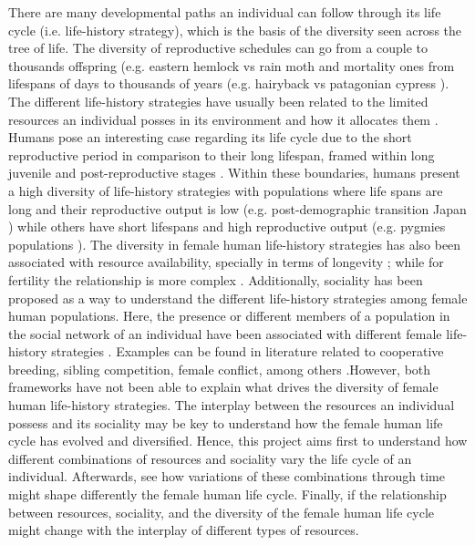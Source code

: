 \documentclass{article}
\begin{document}
There are many developmental paths an individual can follow through its life cycle (i.e. life-history strategy), which is the basis of the diversity seen across the tree of life. The diversity of reproductive schedules can go from a couple to thousands offspring (e.g. eastern hemlock vs rain moth \citep{tindale1932revision,van2017lifetime} and mortality ones from lifespans of days to thousands of years (e.g. hairyback vs patagonian cypress \citep{balsamo1988life,lara19933620}). The different life-history strategies have usually been related to the limited resources an individual posses in its environment and how it allocates them \citep{stearns2000life}. Humans pose an interesting case regarding its life cycle due to the short reproductive period in comparison to their long lifespan, framed within long juvenile and post-reproductive stages \citep{kaplan2000theory}. Within these boundaries, humans present a high diversity of life-history strategies with populations where life spans are long and their reproductive output is low (e.g. post-demographic transition Japan \citep{de2017maximum}) while others have short lifespans and high reproductive output (e.g. pygmies populations \citep{migliano2007life}). The diversity in female human life-history strategies has also been associated with resource availability, specially in terms of longevity \citep{kaplan2003embodied}; while for fertility the relationship is more complex \citep{mulder1998demographic,sear2016understanding}. Additionally, sociality has been proposed as a way to understand the different life-history strategies among female human populations. Here, the presence or different members of a population in the social network of an individual have been associated with different female life-history strategies \citep{sear2011much}. Examples can be found in literature related to cooperative breeding, sibling competition, female conflict, among others \citep{ivey2000cooperative,nitsch2013elder,mace2012female}.However, both frameworks have not been able to explain what drives the diversity of female human life-history strategies. The interplay between the resources an individual possess and its sociality may be key to understand how the female human life cycle has evolved and diversified. Hence,  this project aims first to understand how different combinations of resources and sociality vary the life cycle of an individual. Afterwards, see how variations of these combinations through time might shape differently the female human life cycle. Finally, if the relationship between resources, sociality, and the diversity of the female human life cycle might change with the interplay of different types of resources.
\end{document}
